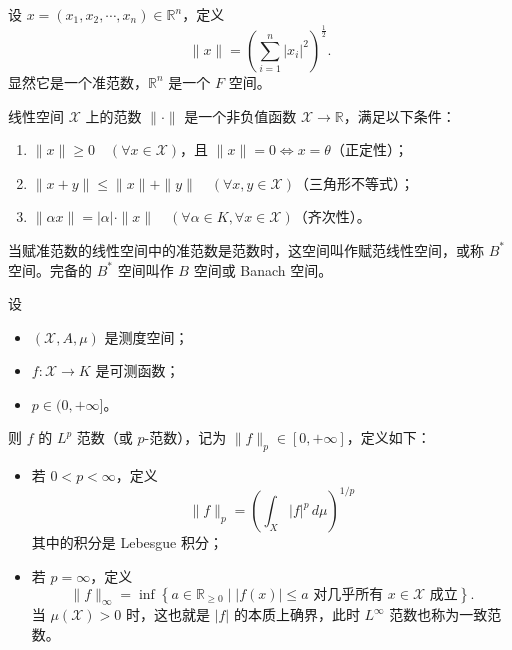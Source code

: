 \documentclass[lang=cn,newtx,10pt,scheme=chinese,thmcnt=chapter]{elegantbook}
\begin{document}
\begin{example}
设 $x = (x_1, x_2, \cdots, x_n) \in \mathbb{R}^n$，定义
\[
\|x\| = \left(\sum_{i=1}^n |x_i|^2 \right)^{\frac{1}{2}}.
\]
显然它是一个准范数，$\mathbb{R}^n$ 是一个 $F$ 空间。
\end{example}
\begin{definition}
线性空间 $\mathscr{X}$ 上的范数 $\|\cdot\|$ 是一个非负值函数 $\mathscr{X} \to \mathbb{R}$，满足以下条件：
\begin{enumerate}
  \item $\|x\| \geqslant 0 \quad (\forall x \in \mathscr{X})$，且 $\|x\| = 0 \Longleftrightarrow x = \theta$（正定性）；
  \item $\|x + y\| \leqslant \|x\| + \|y\| \quad (\forall x, y \in \mathscr{X})$（三角形不等式）；
  \item $\|\alpha x\| = |\alpha| \cdot \|x\| \quad (\forall \alpha \in K, \forall x \in \mathscr{X})$（齐次性）。
\end{enumerate}
\end{definition}

\begin{definition}
当赋准范数的线性空间中的准范数是范数时，这空间叫作赋范线性空间，或称 $B^*$ 空间。完备的 $B^*$ 空间叫作 $B$ 空间或 Banach 空间。
\end{definition}
\begin{definition}[$L^p$ 范数]
设
\begin{itemize}
    \item $(\mathscr{X}, A, \mu)$ 是测度空间；
    \item $f: \mathscr{X} \to K$ 是可测函数；
    \item $p \in (0, +\infty]$。
\end{itemize}
则 $f$ 的 $L^p$ 范数（或 $p$-范数），记为 $\| f \|_p \in [0, +\infty]$，定义如下：
\begin{itemize}
    \item 若 $0 < p < \infty$，定义
    \[
    \| f \|_p = \left( \int_X |f|^p \, d\mu \right)^{1/p}
    \]
    其中的积分是 Lebesgue 积分；\\
    \item 若 $p = \infty$，定义
\[
    \| f \|_{\infty} = \inf \left\{ a \in \mathbb{R}_{\geq 0} \mid |f(x)| \leqslant a \text{ 对几乎所有 } x \in \mathscr{X} \text{ 成立} \right\}.
    \]
    当 $\mu(\mathscr{X}) > 0$ 时，这也就是 $|f|$ 的本质上确界，此时 $L^\infty$ 范数也称为一致范数。
\end{itemize}
\end{definition}
\end{document}
